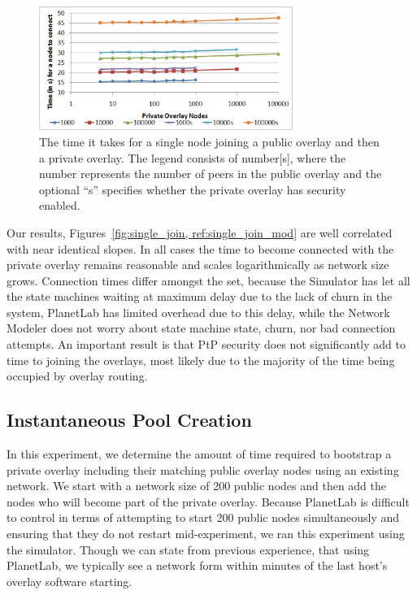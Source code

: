 \documentclass[conference]{IEEEtran}
\begin{document}
\begin{figure}[h]
\centering
\includegraphics[width=3.25in]{single_join_mod.eps}
\caption{The time it takes for a single node joining a public overlay and then
a private overlay. The legend consists of number[s], where the number
represents the number of peers in the public overlay and the optional ``s''
specifies whether the private overlay has security enabled.}
\label{fig:single_join_mod}
\end{figure}

Our results, Figures~\ref{fig:single_join, ref:single_join_mod} are well
correlated with near identical slopes.  In all cases the time to become
connected with the private overlay remains reasonable and scales logarithmically
as network size grows.  Connection times differ amongst the set, because
the Simulator has let all the state machines waiting at maximum delay due to
the lack of churn in the system, PlanetLab has limited overhead due to this
delay, while the Network Modeler does not worry about state machine state,
churn, nor bad connection attempts.  An important result is that PtP security
does not significantly add to time to joining the overlays, most likely due
to the majority of the time being occupied by overlay routing.

\subsection{Instantaneous Pool Creation}
\label{mass_join}
In this experiment, we determine the amount of time required to bootstrap a
private overlay including their matching public overlay nodes using an existing
network.  We start with a network size of 200 public nodes and then add the
nodes who will become part of the private overlay.  Because PlanetLab is
difficult to control in terms of attempting to start 200 public nodes
simultaneously and ensuring that they do not restart mid-experiment, we ran
this experiment using the simulator.  Though we can state from previous
experience, that using PlanetLab, we typically see a network form within
minutes of the last host's overlay software starting.
\end{document}
